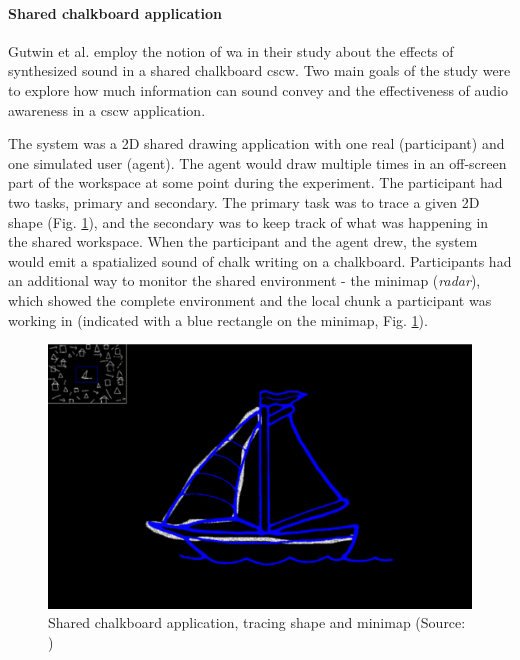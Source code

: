 \paragraph{Shared chalkboard application} 
\label{par:shared_chalkboard_application}
Gutwin et al. \cite{gutwin_chalk_2011} employ the notion of \gls{wa} in their study about the effects of synthesized sound in a shared chalkboard \gls{cscw}.
Two main goals of the study were to explore how much information can sound convey and the effectiveness of audio awareness in a \gls{cscw} application.

The system was a 2D shared drawing application with one real (participant) and one simulated user (agent). The agent would draw multiple times in an off-screen part of the workspace at some point during the experiment. The participant had two tasks, primary and secondary. The primary task was to trace a given 2D shape (Fig. \ref{fig:gutwinchalk2011}), and the secondary was to keep track of what was happening in the shared workspace. When the participant and the agent drew, the system would emit a spatialized sound of chalk writing on a chalkboard. Participants had an additional way to monitor the shared environment -
the minimap (\textit{radar}), which showed the complete environment and the local chunk a participant was working in (indicated with a blue rectangle on the minimap, Fig. \ref{fig:gutwinchalk2011}).

\begin{figure}
	\centering
	\includegraphics[width=0.7\linewidth]{figures/gutwin_chalk_2011}
	\caption{Shared chalkboard application, tracing shape and minimap (Source: \cite{gutwin_chalk_2011})}
	\label{fig:gutwinchalk2011}
\end{figure}


